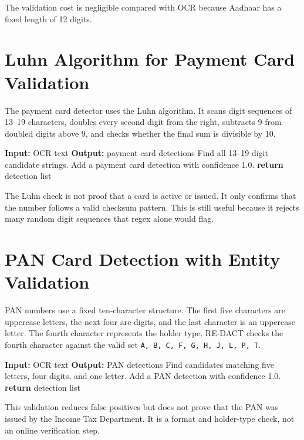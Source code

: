 The validation cost is negligible compared with OCR because Aadhaar has a fixed length of 12 digits.

\section{Luhn Algorithm for Payment Card Validation}

The payment card detector uses the Luhn algorithm. It scans digit sequences of 13--19 characters, doubles every second digit from the right, subtracts 9 from doubled digits above 9, and checks whether the final sum is divisible by 10.

\begin{algorithmic}[1]
\STATE \textbf{Input:} OCR text
\STATE \textbf{Output:} payment card detections
\STATE Find all 13--19 digit candidate strings.
        \STATE Add a payment card detection with confidence 1.0.
    \ENDIF
\ENDFOR
\STATE \textbf{return} detection list
\end{algorithmic}

The Luhn check is not proof that a card is active or issued. It only confirms that the number follows a valid checksum pattern. This is still useful because it rejects many random digit sequences that regex alone would flag.

\section{PAN Card Detection with Entity Validation}

PAN numbers use a fixed ten-character structure. The first five characters are uppercase letters, the next four are digits, and the last character is an uppercase letter. The fourth character represents the holder type. RE-DACT checks the fourth character against the valid set \texttt{A, B, C, F, G, H, J, L, P, T}.

\begin{algorithmic}[1]
\STATE \textbf{Input:} OCR text
\STATE \textbf{Output:} PAN detections
\STATE Find candidates matching five letters, four digits, and one letter.
        \STATE Add a PAN detection with confidence 1.0.
    \ENDIF
\ENDFOR
\STATE \textbf{return} detection list
\end{algorithmic}

This validation reduces false positives but does not prove that the PAN was issued by the Income Tax Department. It is a format and holder-type check, not an online verification step.

